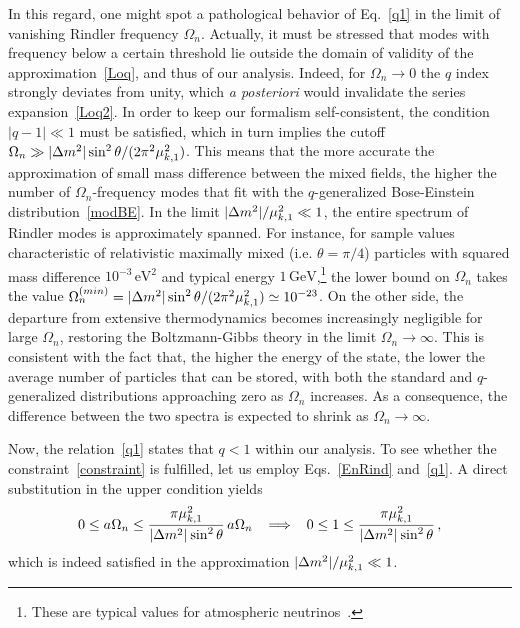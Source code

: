 \documentclass[floats,prd,aps,amssymb,nofootinbib,showkeys]{revtex4}
\begin{document}
In this regard, one might spot a 
pathological behavior of Eq.~\eqref{q1} 
in the limit of vanishing Rindler frequency $\Omega_n$. 
Actually, it must be stressed that 
modes with frequency below 
a certain threshold lie outside the domain of validity
of the approximation~\eqref{Loq}, and thus of our analysis. 
Indeed, for $\Omega_n\rightarrow0$
the $q$ index strongly deviates from unity, 
which \emph{a posteriori} would invalidate 
the series expansion~\eqref{Loq2}. In order
to keep our formalism self-consistent, the condition 
$|q-1|\ll1$ must be satisfied, which in turn implies
the cutoff $\Omega_n\gg|\Delta m^2|\sin^2\theta/(2\pi^2\mu^{\hspace{0.1mm}2}_{k,1})$. 
This means that the more accurate the approximation
of small mass difference between the mixed fields, 
the higher the number of $\Omega_n$-frequency modes 
that fit with the $q$-generalized Bose-Einstein
distribution~\eqref{modBE}. In the 
limit $|\Delta m^2|/\mu^{\hspace{0.1mm}2}_{k,1}\ll1$, 
the entire spectrum of Rindler modes
is approximately spanned. For instance, for sample values characteristic of relativistic 
maximally mixed (i.e. $\theta=\pi/4$) particles with squared mass difference  $10^{-3}\,\mathrm{eV}^2$ and typical energy $1\,\mathrm{GeV}$,\footnote{These are typical values for atmospheric neutrinos~\cite{RPDG}.} 
the lower bound on $\Omega_n$ takes the value
$\Omega^{(min)}_n=|\Delta m^2|\sin^2\theta/(2\pi^2\mu^{\hspace{0.1mm}2}_{k,1})\simeq10^{-23}$.
On the other side, the departure from extensive
thermodynamics becomes increasingly negligible
for large $\Omega_n$, restoring the Boltzmann-Gibbs
theory in the limit $\Omega_n\rightarrow\infty$. This is
consistent with the fact that, 
the higher the energy of the state, the lower the average number of particles that can be stored, with both the 
standard and $q$-generalized distributions approaching
zero as $\Omega_n$ increases. 
As a consequence, the difference between the two spectra 
is expected to shrink as $\Omega_n\rightarrow\infty$. 
 

Now, the relation~\eqref{q1} states that $q<1$
within our analysis. To see whether the 
constraint~\eqref{constraint}
is fulfilled, let us employ Eqs.~\eqref{EnRind} and~\eqref{q1}.
A direct substitution in the upper condition yields
\begin{equation}
0\le a\hspace{0.1mm}\Omega_n\le \frac{\pi \mu^{\hspace{0.1mm}2}_{k,1}}{|\Delta m^2|\hspace{0.2mm}\sin^2\theta}\,a\hspace{0.1mm}\Omega_n\hspace{3mm}\Longrightarrow\hspace{3mm}0\le1\le \frac{\pi \mu^{\hspace{0.1mm}2}_{k,1}}{|\Delta m^2|\hspace{0.2mm}\sin^2\theta}\,,
\end{equation}
which is indeed satisfied in the approximation
$|\Delta m^2|/\mu^{\hspace{0.1mm}2}_{k,1}\ll1$. 
\end{document}
